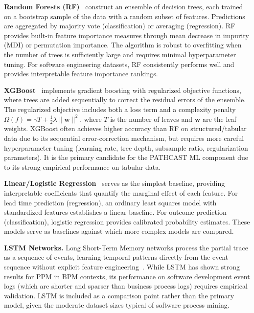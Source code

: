 \textbf{Random Forests (RF)}~\cite{breiman2001random} construct an
ensemble of decision trees, each trained on a bootstrap sample of the
data with a random subset of features. Predictions are aggregated by
majority vote (classification) or averaging (regression). RF provides
built-in feature importance measures through mean decrease in impurity
(MDI) or permutation importance. The algorithm is robust to overfitting
when the number of trees is sufficiently large and requires minimal
hyperparameter tuning. For software engineering datasets, RF consistently
performs well and provides interpretable feature importance rankings.

\textbf{XGBoost}~\cite{chen2016xgboost} implements gradient boosting
with regularized objective functions, where trees are added sequentially
to correct the residual errors of the ensemble. The regularized objective
includes both a loss term and a complexity penalty
$\Omega(f) = \gamma T + \frac{1}{2}\lambda \|\mathbf{w}\|^2$, where
$T$ is the number of leaves and $\mathbf{w}$ are the leaf weights.
XGBoost often achieves higher accuracy than RF on structured/tabular
data due to its sequential error-correction mechanism, but requires
more careful hyperparameter tuning (learning rate, tree depth, subsample
ratio, regularization parameters). It is the primary candidate for the
PATHCAST ML component due to its strong empirical performance on
tabular data.

\textbf{Linear/Logistic Regression}~\cite{hastie2009elements} serves as the simplest baseline,
providing interpretable coefficients that quantify the marginal effect
of each feature. For lead time prediction (regression), an ordinary
least squares model with standardized features establishes a linear
baseline. For outcome prediction (classification), logistic regression
provides calibrated probability estimates. These models serve as
baselines against which more complex models are compared.

\textbf{LSTM Networks.} Long Short-Term Memory networks process the
partial trace as a sequence of events, learning temporal patterns
directly from the event sequence without explicit feature
engineering~\cite{tax2017}. While LSTM has shown strong results
for PPM in BPM contexts, its performance on software development event
logs (which are shorter and sparser than business process logs) requires
empirical validation. LSTM is included as a comparison point rather than
the primary model, given the moderate dataset sizes typical of software
process mining.

